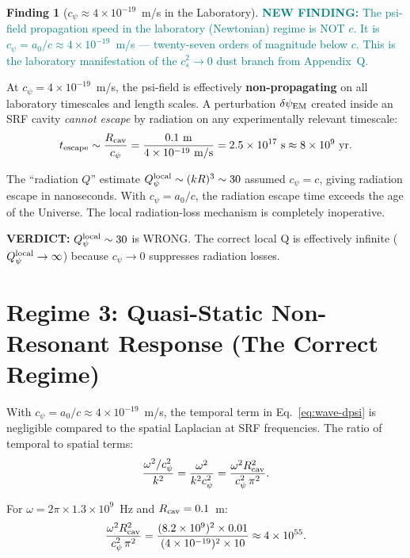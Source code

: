 \documentclass[11pt]{article}
\newcommand{\Qpsi}{Q_\psi}
\newcommand{\ee}[1]{\times 10^{#1}}
\newcommand{\dpsiEM}{\delta\psi_{\rm EM}}
\newcommand{\verdict}[1]{\textcolor{green!50!black}{\textbf{VERDICT:} #1}}
\newcommand{\newfinding}[1]{\textcolor{teal}{\textbf{NEW FINDING:} #1}}
\theoremstyle{definition}
\newtheorem{finding}[theorem]{Finding}
\theoremstyle{remark}
\begin{document}
\begin{finding}[$c_\psi \approx 4\ee{-19}$~m/s in the Laboratory]
\label{find:cpsi}
\newfinding{The psi-field propagation speed in the laboratory
(Newtonian) regime is NOT $c$. It is $c_\psi = a_0/c \approx
4\ee{-19}$~m/s --- twenty-seven orders of magnitude below $c$.
This is the laboratory manifestation of the $c_s^2 \to 0$ dust
branch from Appendix~Q.}

At $c_\psi = 4\ee{-19}$~m/s, the psi-field is effectively
\textbf{non-propagating} on all laboratory timescales and length
scales. A perturbation $\dpsiEM$ created inside an SRF cavity
\emph{cannot escape} by radiation on any experimentally relevant
timescale:
\begin{equation}
t_{\rm escape} \sim \frac{R_{\rm cav}}{c_\psi}
= \frac{0.1~\text{m}}{4\ee{-19}~\text{m/s}}
= 2.5\ee{17}~\text{s}
\approx 8\ee{9}~\text{yr}.
\end{equation}

The ``radiation $Q$'' estimate $\Qpsi^{\rm local} \sim (k R)^3 \sim
30$ assumed $c_\psi = c$, giving radiation escape in nanoseconds.
With $c_\psi = a_0/c$, the radiation escape time exceeds the age
of the Universe. The local radiation-loss mechanism is completely
inoperative.

\verdict{$\Qpsi^{\rm local} \sim 30$ is WRONG. The correct
local Q is effectively infinite ($\Qpsi^{\rm local} \to \infty$)
because $c_\psi \to 0$ suppresses radiation losses.}
\end{finding}


\section{Regime 3: Quasi-Static Non-Resonant Response (The Correct Regime)}
\label{sec:regime3}

With $c_\psi = a_0/c \approx 4\ee{-19}$~m/s, the temporal term
in Eq.~\eqref{eq:wave-dpsi} is negligible compared to the spatial
Laplacian at SRF frequencies. The ratio of temporal to spatial terms:
\begin{equation}
\frac{\omega^2/c_\psi^2}{k^2} = \frac{\omega^2}{k^2 c_\psi^2}
= \frac{\omega^2 R_{\rm cav}^2}{c_\psi^2\,\pi^2}.
\end{equation}

For $\omega = 2\pi \times 1.3\ee{9}$~Hz and $R_{\rm cav} = 0.1$~m:
\begin{equation}
\frac{\omega^2 R_{\rm cav}^2}{c_\psi^2\,\pi^2}
= \frac{(8.2\ee{9})^2 \times 0.01}{(4\ee{-19})^2 \times 10}
\approx 4\ee{55}.
\end{equation}
\end{document}
